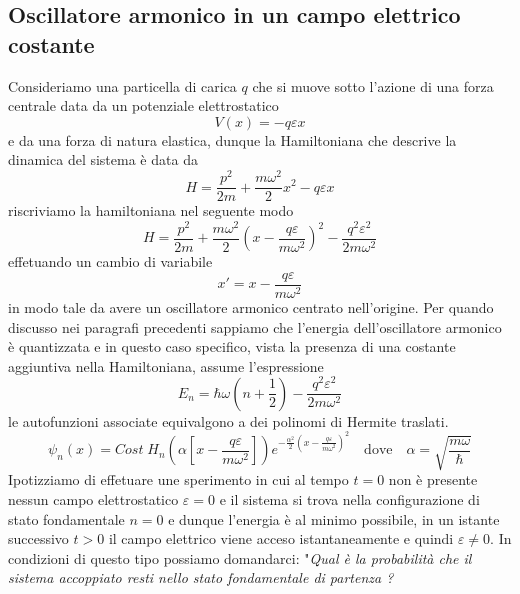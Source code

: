 \subsection{Oscillatore armonico in un campo elettrico costante}

Consideriamo una particella di carica $q$ che si muove sotto l'azione di una forza centrale data da un potenziale elettrostatico 
\begin{equation*}
	V(x) = - q \varepsilon x
\end{equation*}
e da una forza di natura elastica, dunque la Hamiltoniana che descrive la dinamica del sistema \`e data da 
\begin{equation*}
	H = \frac{p^2}{2m} + \frac{m\omega^2}{2}x^2 - q\varepsilon x
\end{equation*}
riscriviamo la hamiltoniana nel seguente modo
\begin{equation*}
	H = \frac{p^2}{2m} + \frac{m \omega^2}{2} \left (x - \frac{q \varepsilon}{m \omega^2 }\right)^2 -\frac{q^2\varepsilon^2}{2m\omega^2}
\end{equation*}
effetuando un cambio di variabile
\begin{equation*}
	x' = x - \frac{q\varepsilon}{m \omega^2}
\end{equation*}
in modo tale da avere un oscillatore armonico centrato nell'origine.
\newpage 
\noindent Per quando discusso nei paragrafi precedenti sappiamo che l'energia dell'oscillatore armonico \`e quantizzata e in questo caso specifico, vista la presenza di una costante aggiuntiva nella Hamiltoniana, assume l'espressione 
\begin{equation*}
	E_n = \hbar \omega\left(n + \frac{1}{2} \right ) - \frac{q^2\varepsilon^2}{2m\omega^2}
\end{equation*}
le autofunzioni associate equivalgono a dei polinomi di Hermite traslati.
\begin{equation*}
	\psi_n(x) = Cost \; H_n \left (\alpha \left [x-\frac{q\varepsilon}{m\omega^2} \right ]  \right )e^{-\frac{\alpha^2}{2}\left (x-\frac{q\varepsilon}{m\omega^2} \right )^2} \quad \text{dove} \quad \alpha = \sqrt{\frac{m\omega}{\hbar}}
\end{equation*}
Ipotizziamo di effetuare une sperimento in cui al tempo $t = 0$ non \`e presente nessun campo elettrostatico $\varepsilon = 0$ e il sistema si trova nella configurazione di stato fondamentale $n = 0$ e dunque l'energia \`e al minimo possibile, in un istante  successivo $t > 0$ il campo elettrico viene acceso istantaneamente e quindi $\varepsilon \neq 0$. In condizioni di questo tipo possiamo domandarci: "\textit{Qual \`e la probabilit\`a che il sistema accoppiato resti nello stato fondamentale di partenza ?}
\newline

